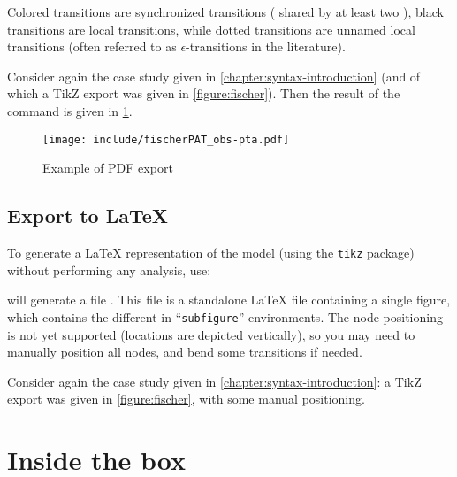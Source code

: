 Colored transitions are synchronized transitions (\ie{} shared by at least two \IPTA{}), black transitions are local transitions, while dotted transitions are unnamed local transitions (often referred to as $\epsilon$-transitions in the literature).

\begin{example}
	Consider again the case study given in \cref{chapter:syntax-introduction} (and of which a TikZ export was given in \cref{figure:fischer}).
	Then the result of the  command is given in \cref{figure:PDF-export}.
\end{example}

\begin{figure}
	\texttt{[image: include/fischerPAT\_obs-pta.pdf]}

	\caption{Example of PDF export}
	\label{figure:PDF-export}
\end{figure}




\section{Export to \LaTeX{}}

To generate a \LaTeX{} representation of the \NIPTA{} model (using the \texttt{tikz} package) without performing any analysis, use:


\imitator{} will generate a file .
This file is a standalone \LaTeX{} file containing a single figure, which contains the different \IPTA{} in ``\texttt{subfigure}'' environments.
The node positioning is not yet supported (locations are depicted vertically), so you may need to manually position all nodes, and bend some transitions if needed.


\begin{example}
	Consider again the case study given in \cref{chapter:syntax-introduction}: a TikZ export was given in \cref{figure:fischer}, with some manual positioning.
\end{example}






\chapter{Inside the box}


